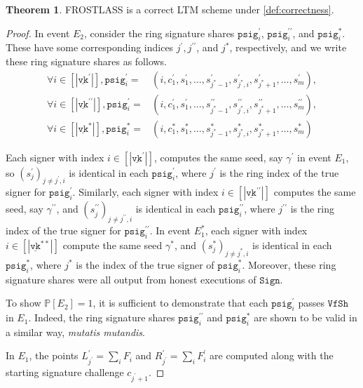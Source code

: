\documentclass[11pt]{article}
\theoremstyle{definition}
\newtheorem{theorem}{Theorem}[section]
\newcommand{\VK}{\underline{\texttt{vk}}}
\newcommand{\psig}{\texttt{psig}}
\newcommand{\sign}{\texttt{Sign}}
\newcommand{\verifyshare}{\texttt{VfSh}}
\begin{document}
\begin{theorem}
FROSTLASS is a correct LTM scheme under \cref{def:correctness}.
\end{theorem}
\begin{proof}
In event $E_2$, consider the ring signature shares $\psig_i^\prime$, $\psig_i^{\prime \prime}$, and $\psig_i^*$. These have some corresponding indices $j^\prime, j^{\prime \prime}$, and $j^*$, respectively, and we write these ring signature shares as follows.
\begin{align*}
\forall i \in \left[\left|\VK^\prime\right|\right], \psig_i^\prime =& (i, c_1^\prime, s_1^\prime, \ldots, s_{j^*-1}^\prime, s_{j^*, i}^\prime, s_{j^*+1}^\prime, \ldots, s_m^\prime),  \\
\forall i \in \left[\left|\VK^{\prime\prime}\right|\right], \psig_i^\prime =& (i, c_1^\prime, s_1^\prime, \ldots, s_{j^*-1}^{\prime\prime}, s_{j^*, i}^{\prime\prime}, s_{j^*+1}^{\prime\prime}, \ldots, s_m^{\prime\prime}),  \\
\forall i \in \left[\left|\VK^*\right|\right], \psig_i^* =& (i, c_1^*, s_1^*, \ldots, s_{j^*-1}^*, s_{j^*, i}^*, s_{j^*+1}^*, \ldots, s_m^*)
\end{align*}  

Each signer with index $i \in \left[\left|\VK^\prime\right|\right]$, computes the same seed, say $\gamma^\prime$ in event $E_1$, so $(s_j^\prime)_{j \neq j^{\prime}, i}$ is identical in each $\psig_i^\prime$, where $j^\prime$ is the ring index of the true signer for $\psig_i^\prime$. Similarly, each signer with index $i \in \left[\left|\VK^{\prime\prime}\right|\right]$ computes the same seed, say $\gamma^{\prime \prime}$, and $(s_j^{\prime \prime})_{j \neq j^{\prime \prime}, i}$ is identical in each $\psig_i^{\prime \prime}$, where $j^{\prime \prime}$ is the ring index of the true signer for $\psig_i^{\prime \prime}$. In event $E_1^*$, each signer with index $i \in \left[\left|\VK^{**}\right|\right]$ 
compute the same seed $\gamma^*$, and $(s_j^*)_{j \neq j^*, i}$ is identical in each $\psig_i^*$, where $j^*$ is the index of the true signer of $\psig_i^*$. Moreover, these ring signature shares were all output from honest executions of $\sign$. 

To show $\mathbb{P}[E_2] = 1$, it is sufficient to demonstrate that each $\psig_i^\prime$ passes $\verifyshare$ in $E_1$. Indeed, the ring signature shares $\psig_i^{\prime \prime}$ and $\psig_i^*$ are shown to be valid in a similar way, \textit{mutatis mutandis}. 

In $E_1$, the points $L_{j^\prime}^\prime = \sum_i F_i$ and $R_{j^\prime}^\prime = \sum_i F_i^\prime$ are computed along with the starting signature challenge $c_{j^\prime+1}$.


\end{proof}
\end{document}
